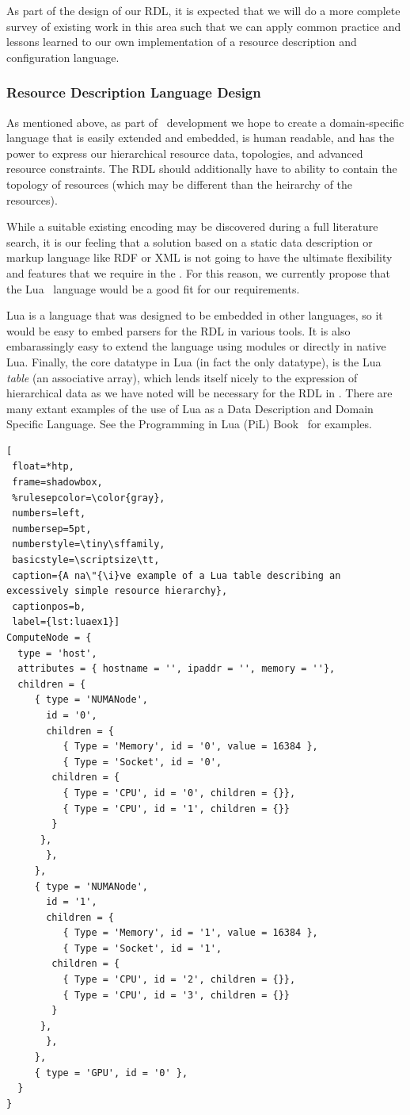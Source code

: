As part of the design of our RDL, it is expected that we will do a
more complete survey of existing work in this area such that we can
apply common practice and lessons learned to our own implementation
of a resource description and configuration language.

\subsubsection{Resource Description Language Design}

As mentioned above, as part of \ngrm\ development we hope to
create a domain-specific language that is
easily extended and embedded, is human readable, and has the
power to express our hierarchical resource data, topologies,
and advanced resource constraints. The RDL should additionally
have to ability to contain the topology of resources
(which may be different than the heirarchy of the resources).

While a suitable existing encoding may be discovered during
a full literature search, it is our feeling that a solution
based on a static data description or markup language like
RDF or XML is not going to have the ultimate flexibility and
features that we require in the \ngrm.  For this reason, we
currently propose that the Lua~\cite{LuaBook}
language would be a good fit for our requirements.

Lua is a language that was designed to be embedded in other
languages, so it would be easy to embed parsers for the RDL
in various tools. It is also embarassingly easy to extend the
language using modules or directly in native Lua. Finally,
the core datatype in Lua (in fact the only datatype), is
the Lua \emph{table} (an associative array), which lends
itself nicely to the expression of hierarchical data as
we have noted will be necessary for the RDL in \ngrm. There
are many extant examples of the use of Lua as a Data Description
and Domain Specific Language. See the Programming in Lua (PiL)
Book~\cite{LuaBook} for examples.

\begin{lstlisting}[
 float=*htp,
 frame=shadowbox,
 %rulesepcolor=\color{gray},
 numbers=left,
 numbersep=5pt,
 numberstyle=\tiny\sffamily,
 basicstyle=\scriptsize\tt,
 caption={A na\"{\i}ve example of a Lua table describing an excessively simple resource hierarchy},
 captionpos=b,
 label={lst:luaex1}]
ComputeNode = {
  type = 'host',
  attributes = { hostname = '', ipaddr = '', memory = ''},
  children = {
     { type = 'NUMANode',
       id = '0',
       children = {
          { Type = 'Memory', id = '0', value = 16384 },
          { Type = 'Socket', id = '0',
	    children = {
	      { Type = 'CPU', id = '0', children = {}},
	      { Type = 'CPU', id = '1', children = {}}
	    }
	  },
       },
     },
     { type = 'NUMANode',
       id = '1',
       children = {
          { Type = 'Memory', id = '1', value = 16384 },
          { Type = 'Socket', id = '1',
	    children = {
	      { Type = 'CPU', id = '2', children = {}},
	      { Type = 'CPU', id = '3', children = {}}
	    }
	  },
       },
     },
     { type = 'GPU', id = '0' },
  }
}
\end{lstlisting}


